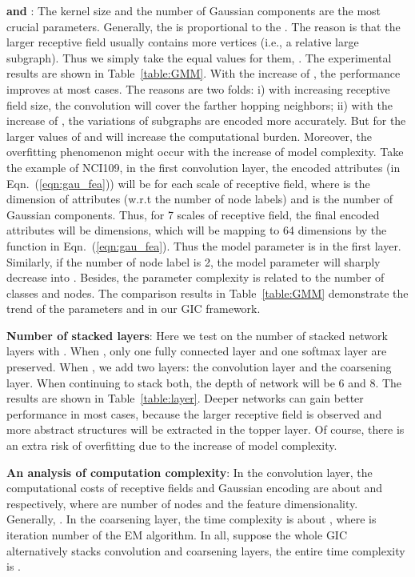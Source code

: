 \documentclass[letterpaper]{article} \usepackage{aaai19}  \usepackage{times}  \usepackage{helvet}  \usepackage{courier}  \usepackage{url}  \usepackage{graphicx}  \frenchspacing  \setlength{\pdfpagewidth}{8.5in}  \setlength{\pdfpageheight}{11in}
\def\ie{{i.e.}} \def\etal{{et.al}}
\begin{document}
\textbf{ and }: The kernel size  and the number of Gaussian components  are the most crucial parameters. Generally, the  is proportional to the . The reason is that the larger receptive field usually contains more vertices (\ie, a relative large subgraph). Thus we simply take the equal values for them, . The experimental results are shown in Table~\ref{table:GMM}. With the increase of , the performance improves at most cases. The reasons are two folds: i) with increasing receptive field size, the convolution will cover the farther hopping neighbors; ii) with the increase of , the variations of subgraphs are encoded more accurately. But for the larger values of  and  will increase the computational burden. Moreover, the overfitting phenomenon might occur with the increase of model complexity. Take the example of NCI109, in the first convolution layer, the encoded attributes (in Eqn.~(\ref{eqn:gau_fea})) will be  for each scale of receptive field, where  is the dimension of attributes (w.r.t the number of node labels) and  is the number of Gaussian components. Thus, for 7 scales of receptive field, the final encoded attributes will be  dimensions, which will be mapping to 64 dimensions by the function  in Eqn.~(\ref{eqn:gau_fea}). Thus the model parameter is  in the first layer. Similarly, if the number of node label is 2, the model parameter will sharply decrease into . Besides, the parameter complexity is related to the number of classes and nodes. The comparison results in Table~\ref{table:GMM} demonstrate the trend of the parameters  and  in our GIC framework.

\textbf{Number of stacked layers}: Here we test on the number of stacked network layers with . When , only one fully connected layer and one softmax layer are preserved. When , we add two layers: the convolution layer and the coarsening layer. When continuing to stack both, the depth of network will be 6 and 8. The results are shown in Table~\ref{table:layer}. Deeper networks can gain better performance in most cases, because the larger receptive field is observed and more abstract structures will be extracted in the topper layer. Of course, there is an extra risk of overfitting due to the increase of model complexity.

\textbf{An analysis of computation complexity}: In the convolution layer, the computational costs of receptive fields and Gaussian encoding are about  and  respectively, where  are number of nodes and the feature dimensionality. Generally, . In the coarsening layer, the time complexity is about , where  is iteration number of the EM algorithm. In all, suppose the whole GIC alternatively stacks  convolution and coarsening layers, the entire time complexity is .
\end{document}
